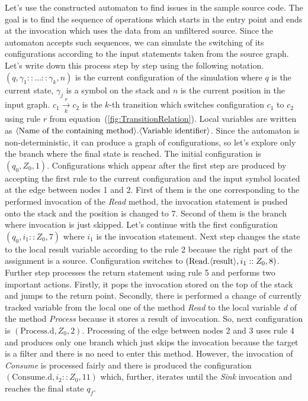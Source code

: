 Let's use the constructed automaton to find issues in the sample source code.
The goal is to find the sequence of operations which starts in the entry point and ends at the invocation which uses the data from an unfiltered source.
Since the automaton accepts such sequences, we can simulate the switching of its configurations according to the input statements taken from the source graph.
Let's write down this process step by step using the following notation.
$(q, \gamma_1 :: \ldots :: \gamma_k, n)$ is the current configuration of the simulation where $q$ is the current state, $\gamma_j$ is a symbol on the stack and $n$ is the current position in the input graph.
$c_1 \xrightarrow[k]{r} c_2$ is the $k$-th transition which switches configuration $c_1$ to $c_2$ using rule $r$ from equation~(\ref{fig:TransitionRelation}).
Local variables are written as $\text{\textlangle{}Name of the containing method\textrangle{}}.\text{\textlangle{}Variable identifier\textrangle{}}$.
Since the automaton is non-deterministic, it can produce a graph of configurations, so let's explore only the branch where the final state is reached.
The initial configuration is $(q_0, Z_0, 1)$.
Configurations which appear after the first step are produced by accepting the first rule to the current configuration and the input symbol located at the edge between nodes 1 and 2.
First of them is the one corresponding to the performed invocation of the \textit{Read} method, the invocation statement is pushed onto the stack and the position is changed to 7. Second of them is the branch where invocation is just skipped. 
Let's continue with the first configuration $(q_0, i_1 :: Z_0, 7)$ where $i_1$ is the invocation statement.
Next step changes the state to the local \textlangle{}result\textrangle{} variable according to the rule 2 because the right part of the assignment is a source. Configuration switches to $(\text{Read.\textlangle{}result\textrangle{}}, i_1 :: Z_0, 8)$.
Further step processes the return statement using rule 5 and performs two important actions.
Firstly, it pops the invocation stored on the top of the stack and jumps to the return point.
Secondly, there is performed a change of currently tracked variable from the local one of the method \textit{Read} to the local variable \textit{d} of the method \textit{Process} because it stores a result of invocation.
So, next configuration is $(\text{Process.d}, Z_0, 2)$.
Processing of the edge between nodes 2 and 3 uses rule 4 and produces only one branch which just skips the invocation because the target is a filter and there is no need to enter this method.
However, the invocation of \textit{Consume} is processed fairly and there is produced the configuration $(\text{Consume.d}, i_2 :: Z_0, 11)$ which, further, iterates until the \textit{Sink} invocation and reaches the final state $q_f$.

